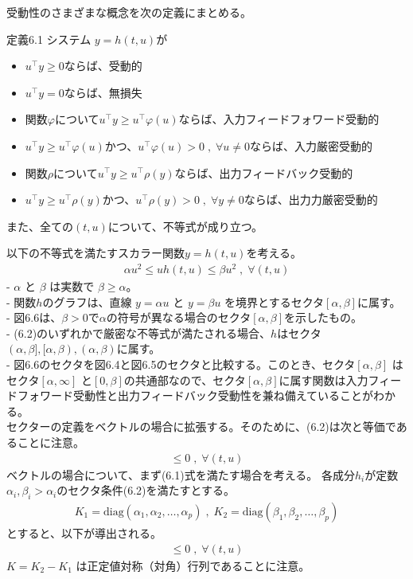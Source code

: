 \documentclass{jsarticle}
\begin{document}
受動性のさまざまな概念を次の定義にまとめる。
\begin{itembox}[l]{定義6.1}
  システム $y=h(t,u)$が
  \begin{itemize}
    \item $u^\top y \geq 0$ならば、受動的
    \item $u^\top y = 0$ならば、無損失
    \item 関数$\varphi$について$u^\top y \geq u^\top \varphi(u)$ならば、入力フィードフォワード受動的
    \item $u^\top y \geq u^\top \varphi(u)$かつ、$u^\top \varphi(u)>0\;,\;\forall u\neq 0$ならば、入力厳密受動的
    \item 関数$\rho$について$u^\top y \geq u^\top \rho(y)$ならば、出力フィードバック受動的
    \item $u^\top y \geq u^\top \rho(y)$かつ、$u^\top \rho(y)>0\;,\;\forall y\neq 0$ならば、出力力厳密受動的
  \end{itemize}
  また、全ての$(t,u)$について、不等式が成り立つ。
\end{itembox}

以下の不等式を満たすスカラー関数$y = h(t, u)$を考える。
\begin{align}
  \alpha u^2 \leq uh(t,u)\leq \beta u^2\;,\; \forall (t,u)\tag{6.2}
\end{align}
- $\alpha$ と $\beta$ は実数で $\beta \geq \alpha$。\\
- 関数$h$のグラフは、直線 $y = \alpha u$ と $y=\beta u$ を境界とするセクタ$[\alpha, \beta]$に属す。\\
- 図6.6は、$\beta> 0$で$\alpha$の符号が異なる場合のセクタ$[\alpha, \beta]$を示したもの。\\
- (6.2)のいずれかで厳密な不等式が満たされる場合、$h$はセクタ$(\alpha, \beta],[\alpha, \beta),(\alpha, \beta)$に属す。\\
- 図6.6のセクタを図6.4と図6.5のセクタと比較する。このとき、セクタ$[\alpha, \beta]$ はセクタ$[\alpha, \infty]$ と$[0, \beta]$の共通部なので、セクタ$[\alpha, \beta]$に属す関数は入力フィードフォワード受動性と出力フィードバック受動性を兼ね備えていることがわかる。\\

セクターの定義をベクトルの場合に拡張する。そのために、(6.2)は次と等価であることに注意。
\begin{align}
  [h(t,u)-\alpha u][h(t,u)-\beta u]\leq 0\;,\; \forall (t,u) \tag{6.3}
\end{align}
ベクトルの場合について、まず(6.1)式を満たす場合を考える。
各成分$h_i$が定数$\alpha_i,\beta_i>\alpha_i$のセクタ条件(6.2)を満たすとする。
\begin{align}
  K_1 = \text{diag}(\alpha_1,\alpha_2,\dots,\alpha_p)\;,\;K_2 = \text{diag}(\beta_1,\beta_2,\dots,\beta_p)
\end{align} 
とすると、以下が導出される。
\begin{align}
  [h(t,u)-K_1 u][h(t,u)-K_2 u]\leq 0 \;,\;\forall (t,u) \tag{6.4}
\end{align}
$K = K_2 - K_1$ は正定値対称（対角）行列であることに注意。
\end{document}
